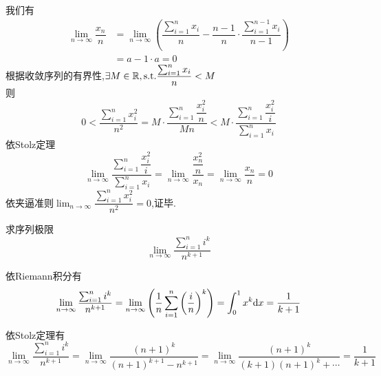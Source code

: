 \documentclass[a4paper]{ctexart}
\begin{document}
\begin{solution}[Proof.]
    我们有
    \begin{align*}
    \lim_{n\to\infty}{\dfrac{x_n}{n}} 
    &= \lim_{n\to\infty}{\left(\dfrac{\sum_{i=1}^{n}{x_i}}{n}-\dfrac{n-1}{n}\cdot\dfrac{\sum_{i=1}^{n-1}{x_i}}{n-1}\right)} \\
    &= a-1\cdot a= 0
    \end{align*}
    根据收敛序列的有界性,$\exists M\in\mathbb{R},\text{s.t.}\dfrac{\sum_{i=1}^{n}{x_i}}{n}<M$\\
    则$$0<\dfrac{\sum_{i=1}^{n}{x_i^2}}{n^2}=M\cdot\dfrac{\sum_{i=1}^{n}{\dfrac{x_i^2}{n}}}{Mn}<M\cdot\dfrac{\sum_{i=1}^{n}{\dfrac{x_i^2}{i}}}{\sum_{i=1}^{n}{x_i}}$$
    依Stolz定理$$\lim_{n\to\infty}{\dfrac{\sum_{i=1}^{n}{\dfrac{x_i^2}{i}}}{\sum_{i=1}^{n}{x_i}}}=\lim_{n\to\infty}{\dfrac{\dfrac{x_n^2}{n}}{x_n}}=\lim_{n\to\infty}{\dfrac{x_n}{n}}=0$$
    依夹逼准则$\displaystyle\lim_{n\to\infty}{\dfrac{\sum_{i=1}^{n}{x_i^2}}{n^2}}=0$,证毕.\\
\end{solution}
\begin{problem}[例2.]
    求序列极限$$\lim_{n\to\infty}{\dfrac{\sum_{i=1}^n{i^k}}{n^{k+1}}}$$
\end{problem}
\begin{solution}
    依Riemann积分有$$\lim_{n\to\infty}{\dfrac{\sum_{i=1}^n{i^k}}{n^{k+1}}}=\lim_{n\to\infty}{\left(\dfrac{1}{n}\sum_{i=1}^{n}{\left(\dfrac{i}{n}\right)^k}\right)}=\int_0^1{x^k\mathrm{d} x}=\dfrac{1}{k+1}$$
\end{solution}
\begin{solution}
    依Stolz定理有$$\lim_{n\to\infty}{\dfrac{\sum_{i=1}^n{i^k}}{n^{k+1}}}=\lim_{n\to\infty}{\dfrac{(n+1)^k}{(n+1)^{k+1}-n^{k+1}}}=\lim_{n\to\infty}{\dfrac{(n+1)^k}{(k+1)(n+1)^k+\cdots}}=\dfrac{1}{k+1}$$
\end{solution}
\end{document}
